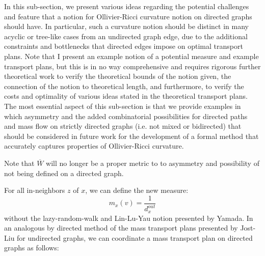 \documentclass{Dissertate}
\theoremstyle{definition}
\theoremstyle{definition} %
\theoremstyle{definition}
\begin{document}
In this sub-section, we present various ideas regarding the potential challenges and feature that a notion for Ollivier-Ricci curvature notion on directed graphs should have. In particular, such a curvature notion should be distinct in many acyclic or tree-like cases from an undirected graph edge, due to the additional constraints and bottlenecks that directed edges impose on optimal transport plans. Note that I present an example notion of a potential measure and example transport plans, but this is in no way comprehensive and requires rigorous further theoretical work to verify the theoretical bounds of the notion given, the connection of the notion to theoretical length, and furthermore, to verify the costs and optimality of various ideas stated in the theoretical transport plans. The most essential aspect of this sub-section is that we provide examples in which asymmetry and the added combinatorial possibilities for directed paths and mass flow on strictly directed graphs (i.e. not mixed or bidirected) that should be considered in future work for the development of a formal method that accurately captures properties of Ollivier-Ricci curvature. 

Note that $\overline{W}$ will no longer be a proper metric to to asymmetry and possibility of not being defined on a directed graph. 


For all in-neighbors $z$ of $x$, we can define  the new measure:
$$
m_x(v) = \frac{1}{d_x^{out}}
$$
without the lazy-random-walk and Lin-Lu-Yau notion presented by Yamada. In an analogous by directed method of the mass transport plans presented by Jost-Liu for undirected graphs, we can coordinate a mass transport plan on directed graphs as follows: 
\end{document}
